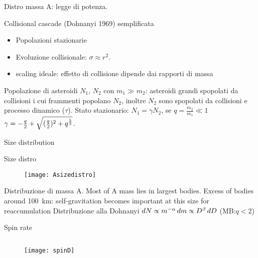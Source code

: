 \begin{wordonframe}{Distro massa A: legge di potenza.}
\begin{block}{Collisional cascade (Dohnanyi 1969) semplificata}
\begin{itemize}
\item Popolazioni stazionarie
\item Evoluzione collisionale: $\sigma\approx r^2$.
\item scaling ideale: effetto di collisione dipende dai rapporti di massa
\end{itemize}
Popolazione di asteroidi $N_1$, $N_2$ con $m_1\gg m_2$: asteroidi grandi spopolati da collisioni i cui frammenti popolano $N_2$, inoltre $N_2$ sono spopolati da collisioni e processo dinamico ($\tau$).
Stato stazionario: $N_1=\gamma N_2$, se $q=\frac{m_2}{m_1}\ll1$ $\gamma=-\frac{q}{2}+\sqrt{(\frac{q}{2})^2+q^{\frac{5}{3}}}$.
\end{block}
\end{wordonframe}

\begin{frame}{Size distribution}
\begin{block}{Size distro}
\begin{figure}[!ht]\texttt{[image: Asizedistro]}
\end{figure}
\end{block}
\end{frame}

\begin{wordonframe}{Distribuzione di massa A.}
Most of A mass lies in largest bodies. Excess of bodies around \SI{100}{\kilo\meter}: self-gravitation becomes important at this size for reaccumulation
Distribuzione alla Dohnanyi  $dN\propto m^{-\alpha}\,dm\propto D^{\beta}\,dD$ (MB:$q<2$)
\end{wordonframe}

\begin{frame}{Spin rate}
\begin{columns}[T]
\begin{column}{0.5\textwidth}
\begin{figure}[!ht]\texttt{[image: spinD]}
\end{figure}
\end{column}
\begin{column}{0.5\textwidth}
\end{column}
\end{columns}
\end{frame}

